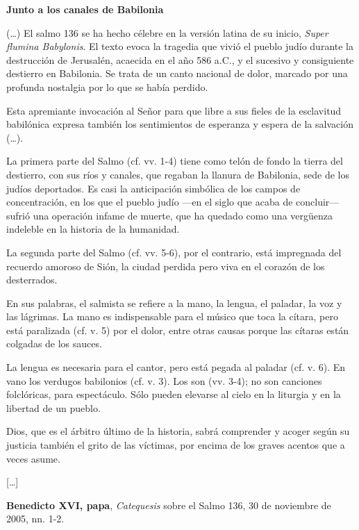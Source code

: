 \begin{patercite}
	\textbf{Junto a los canales de Babilonia}
	
	(\ldots) El
	salmo 136 se ha hecho célebre en la versión latina de su inicio, \emph{Super flumina Babylonis}. El texto evoca la tragedia que vivió el
	pueblo judío durante la destrucción de Jerusalén, acaecida en el año 586 a.C., y el sucesivo y consiguiente destierro en Babilonia. Se trata de un canto nacional de dolor, marcado por una profunda nostalgia por lo que se había perdido.
	
	Esta apremiante invocación al Señor para que libre a sus fieles de la esclavitud babilónica expresa también los sentimientos de esperanza y espera de la salvación (\ldots).
	
	La primera parte del Salmo (cf. vv. 1-4) tiene como telón de fondo la tierra del destierro, con sus ríos y canales, que regaban la llanura de Babilonia, sede de los judíos deportados. Es casi la anticipación simbólica de los campos de concentración, en los que el pueblo judío ---en el siglo que acaba de concluir--- sufrió una operación infame de muerte, que ha quedado como una vergüenza indeleble en la historia de la humanidad.
	
	La  segunda  parte  del Salmo (cf. vv. 5-6), por el contrario, está impregnada del recuerdo amoroso de Sión, la ciudad perdida pero viva en el corazón de los desterrados.
	
	En sus palabras, el salmista se refiere a la mano, la lengua, el paladar, la voz y las lágrimas. La mano es indispensable para el músico que toca la cítara, pero está paralizada (cf. v. 5) por el dolor, entre otras causas porque las cítaras están colgadas de los sauces.
	
	La lengua es necesaria para el cantor, pero está pegada al paladar (cf. v. 6). En vano los verdugos babilonios  (cf. v. 3). Los  son  (vv. 3-4); no son canciones folclóricas, para espectáculo. Sólo pueden elevarse al cielo en la liturgia y en la libertad de un pueblo.
	
	Dios, que es el árbitro último de la historia, sabrá comprender y acoger según su justicia también el grito de las víctimas, por encima de los graves acentos que a veces asume.
	
	[\ldots]
	
	\textbf{Benedicto XVI, papa}, \textit{Catequesis} sobre el Salmo 136, 30 de noviembre de 2005, nn. 1-2.
\end{patercite}

